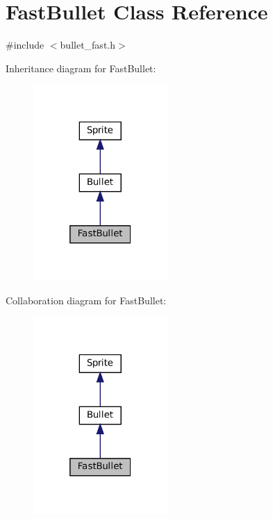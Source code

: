 \hypertarget{classFastBullet}{}\section{Fast\+Bullet Class Reference}
\label{classFastBullet}


{\ttfamily \#include $<$bullet\+\_\+fast.\+h$>$}



Inheritance diagram for Fast\+Bullet\+:\nopagebreak
\begin{figure}[H]
\begin{center}
\leavevmode
\includegraphics[width=145pt]{classFastBullet__inherit__graph}
\end{center}
\end{figure}


Collaboration diagram for Fast\+Bullet\+:\nopagebreak
\begin{figure}[H]
\begin{center}
\leavevmode
\includegraphics[width=145pt]{classFastBullet__coll__graph}
\end{center}
\end{figure}
